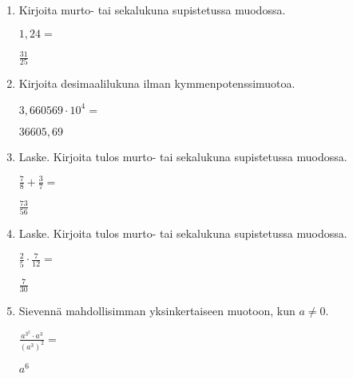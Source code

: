 \documentclass[finnish, a4paper, 12pt]{article}
\begin{document}
	\begin{enumerate}[leftmargin=*]
		\setlength\itemsep{1em}
		
		\item %
		Kirjoita murto- tai sekalukuna supistetussa muodossa. 
		
		\(
		1{,}24 = 
		\) %
		
		\begin{version:withAnswers}
		\( \frac{31}{25} \)
		\end{version:withAnswers}

		\vspace{8pt}
		
		\item %
		Kirjoita desimaalilukuna ilman kymmenpotenssimuotoa. 
		
		\(
		3{,}660569\cdot 10^{4} = 
		\) %
		\begin{version:withAnswers}
		\( 36605,69 \)
		\end{version:withAnswers}	
		\vspace{8pt}
		
		\item %
		Laske. Kirjoita tulos murto- tai sekalukuna supistetussa muodossa.
		
		\(
		\displaystyle
		\frac{7}{8}+\frac{3}{7} = 
		\) %
		\begin{version:withAnswers}
		\( \frac{73}{56} \)
		\end{version:withAnswers}	
		
		\vspace{8pt}
		
		\item %
		Laske. Kirjoita tulos murto- tai sekalukuna supistetussa muodossa.
		
		\(
		\displaystyle
		\frac{2}{5}\cdot\frac{7}{12} = 
		\) %
		\begin{version:withAnswers}
		\( \frac{7}{30} \)
		\end{version:withAnswers}
		
		\vspace{8pt}
		
		\item %
		Sievennä mahdollisimman yksinkertaiseen muotoon, kun \(a \not = 0\). 
		
		\(
		\displaystyle
		\frac{a^{3^2}\cdot a^3}{\left(a^3\right)^2} =
		\phantom{mmmmmmmmmmmmmmm}
		\) %
		\begin{version:withAnswers}
		\(  a^{6} \)
		\end{version:withAnswers}
		

\end{enumerate}
\end{document}
